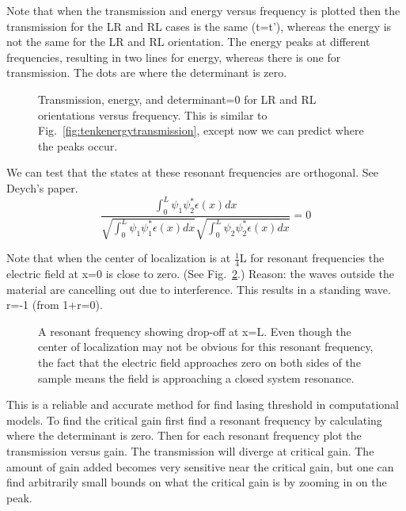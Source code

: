 Note that when the transmission and energy versus frequency is plotted then the transmission for the LR and RL cases is the same (t=t'), whereas the energy is not the same for the LR and RL orientation. The energy peaks at different frequencies, resulting in two lines for energy, whereas there is one for transmission.  The dots are where the determinant is zero.

\begin{figure}
\vskip -0.5cm
\centerline{
} 
\vskip -0.5cm
\caption{Transmission, energy, and determinant=0 for LR and RL orientations versus frequency. This is similar to Fig.~\ref{fig:tenkenergytransmission}, except now we can predict where the peaks occur.}
\label{fig:energytransmissiondet}
\end{figure}
We can test that the states at these resonant frequencies are orthogonal. See Deych's paper\cite{2005_Deych}.
\begin{equation}
\frac{\int _0 ^L \psi _1 \psi _2 ^* \epsilon(x) dx}
{\sqrt{\int _0 ^L \psi _1 \psi _1 ^* \epsilon(x) dx}
 \sqrt{\int _0 ^L \psi _2 \psi _2 ^* \epsilon(x) dx}} = 0
\end{equation}

Note that when the center of localization is at $ \frac{1}{4} $L for resonant frequencies the electric field at x=0 is close to zero.  (See Fig.~\ref{fig:standingwave}.) Reason: the waves outside the material are cancelling out due to interference.  This results in a standing wave.   r=-1 (from 1+r=0).

\begin{figure}
\vskip -0.5cm
\centerline{
}
\vskip -0.5cm
\caption{A resonant frequency showing drop-off at x=L. Even though the center of localization may not be obvious for this resonant frequency, the fact that the electric field approaches zero on both sides of the sample means the field is approaching a closed system resonance.}
\label{fig:standingwave}
\end{figure}

This is a reliable and accurate method for find lasing threshold in computational models. To find the critical gain first find a resonant frequency by calculating where the determinant is zero. Then for each resonant frequency plot the transmission versus gain. The transmission will diverge at critical gain. The amount of gain added becomes very sensitive near the critical gain, but one can find arbitrarily small bounds on what the critical gain is by zooming in on the peak.

